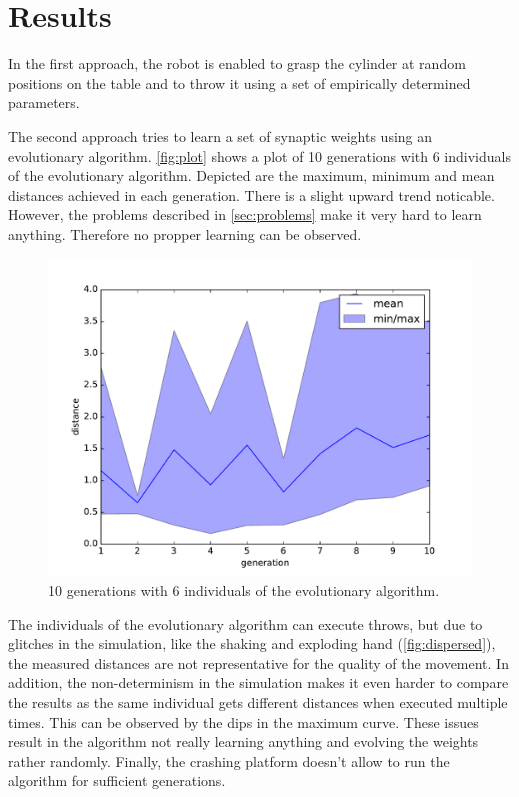 \section{Results}
\label{sec:results}
In the first approach, the robot is enabled to grasp the cylinder at random positions on the table and to throw it using a set of empirically determined parameters.

The second approach tries to learn a set of synaptic weights using an evolutionary algorithm.
\autoref{fig:plot} shows a plot of 10 generations with 6 individuals of the evolutionary algorithm.
Depicted are the maximum, minimum and mean distances achieved in each generation.
There is a slight upward trend noticable.
However, the problems described in \autoref{sec:problems} make it very hard to learn anything.
Therefore no propper learning can be observed.

\begin{figure}[h]
\centering
\includegraphics[width=\columnwidth]{figures/ea_plot.pdf}
\caption{10 generations with 6 individuals of the evolutionary algorithm.}
\label{fig:plot}
\end{figure}

The individuals of the evolutionary algorithm can execute throws, but due to glitches in the simulation, like the shaking and exploding hand (\autoref{fig:dispersed}), the measured distances are not representative for the quality of the movement.
In addition, the non-determinism in the simulation makes it even harder to compare the results as the same individual gets different distances when executed multiple times.
This can be observed by the dips in the maximum curve.
These issues result in the algorithm not really learning anything and evolving the weights rather randomly.
Finally, the crashing platform doesn't allow to run the algorithm for sufficient generations.